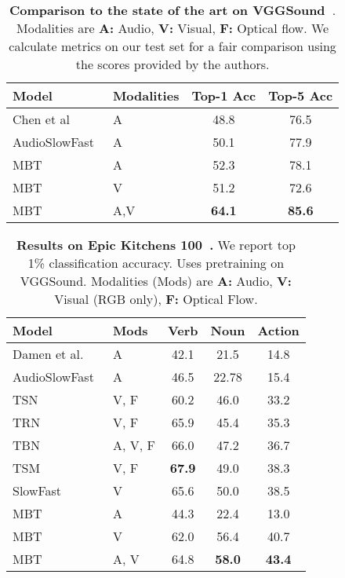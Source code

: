\begin{table}
           \begin{tabular}{llcc}
                \toprule 
                Model & Modalities & Top-1 Acc & Top-5 Acc \\
                \midrule 
                Chen et al~\cite{chen2020vggsound} & A & 48.8 & 76.5\\
                AudioSlowFast~\cite{kazakos2021slow} & A & 50.1 & 77.9 \\
                \hdashline
                MBT & A & 52.3 & 78.1\\
                MBT & V & 51.2 & 72.6 \\
                MBT & A,V & \textbf{64.1} & \textbf{85.6} \\
                \bottomrule 
            \end{tabular}
        \caption{\textbf{Comparison to the state of the art on VGGSound~\cite{chen2020vggsound}}. Modalities are \textbf{A:} Audio, \textbf{V:} Visual, \textbf{F:} Optical flow.  We calculate metrics on our test set for a fair comparison using the scores provided by the authors.}
        \label{tab:vggsound-sota}

    \end{table}
 \iffalse
\begin{table}[h]
    \centering
    \begin{tabular}{llccc}
    \toprule 
  Model & Mods & Verb & Noun & Action \\
  \midrule 
  Damen et al.~\cite{damen2020rescaling} & A & 42.1 & 21.5 & 14.8 \\
  AudioSlowFast~\cite{kazakos2021slow} & A & 46.5 & 22.78 & 15.4 \\
  TSN~\cite{wang2016temporal}  & V, F & 60.2 & 46.0 & 33.2  \\
  TRN~\cite{zhou2018temporal} & V, F & 65.9 & 45.4 & 35.3 \\
  TBN~\cite{kazakos2019epic} & A, V, F &   66.0 & 47.2 & 36.7 \\
  TSM~\cite{lin2019temporal} & V, F &  \textbf{67.9} & 49.0 & 38.3 \\ 
SlowFast~\cite{feichtenhofer2019slowfast} & V & 65.6 & 50.0 & 38.5 \\ 
\hdashline
  MBT  & A &  44.3 & 22.4 & 13.0\\
  MBT & V & 62.0  & 56.4 & 40.7\\
  MBT & A, V & 64.8 & \textbf{58.0} & \textbf{43.4}\\
    \bottomrule 
    \end{tabular}
    \caption{\textbf{Results on Epic Kitchens 100~\cite{damen2020rescaling}.} We report top 1\% classification accuracy.  Uses pretraining on VGGSound. Modalities (Mods) are \textbf{A:} Audio, \textbf{V:} Visual (RGB only), \textbf{F:} Optical Flow.}
    \label{tab:epickitchens-sota}
\end{table}

